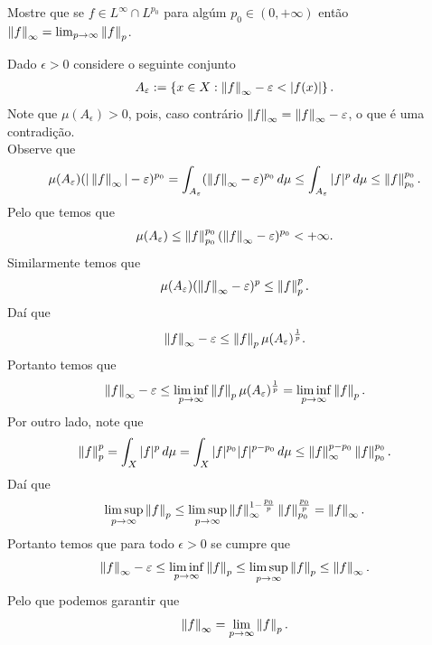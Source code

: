 \begin{homeworkProblem}[5]
  Mostre que se $f\in L^{\infty}\cap L^{p_0}$ para algúm $p_0\in (0,+\infty)$ então $\left\|f\right\|_{\infty}=\lim_{p \to \infty}\left\|f\right\|_p$. 
  \begin{solution}
    Dado $\epsilon>0$ considere o seguinte conjunto
    \begin{align*}
      A_{\epsilon}:=\left\{ x\in X: \norm{f}_{\infty}-\epsilon<|f(x)| \right\}.
    \end{align*}
    Note que $\mu(A_\epsilon)>0$, pois, caso contrário $\left\|f\right\|_{\infty}=\left\|f\right\|_{\infty}-\varepsilon$, o que é uma contradição.\\
    Observe que
    \begin{align*}
      \mu(A_{\varepsilon})(|\left\|f\right\|_{\infty}|-\varepsilon)^{p_0}=\int_{A_{\varepsilon}}(\left\|f\right\|_{\infty}-\varepsilon)^{p_0}\,d\mu\leq \int_{A_\varepsilon}|f|^{p}\,d\mu\leq \left\|f\right\|_{p_0}^{p_0}.
    \end{align*}
    Pelo que temos que
    \begin{align*}
      \mu(A_\varepsilon)\leq \left\|f\right\|_{p_0}^{p_0}(\left\|f\right\|_{\infty}-\varepsilon)^{p_0}<+\infty.
    \end{align*}
    Similarmente temos que
    \begin{align*}
      \mu(A_\varepsilon)(\left\|f\right\|_{\infty}-\varepsilon)^{p}\leq \left\|f\right\|_{p}^{p}.
    \end{align*}
    Daí que
    \begin{align*}
      \left\|f\right\|_{\infty}-\varepsilon\leq\left\|f\right\|_{p}\mu(A_\varepsilon)^{\frac{1}{p}}.
    \end{align*}
    Portanto temos que
    \begin{align*}
      \left\|f\right\|_{\infty}-\varepsilon\leq \liminf_{p \to \infty}\left\|f\right\|_{p}\mu(A_{\varepsilon})^{\frac{1}{p}}=\liminf_{p\to\infty}\left\|f\right\|_p.
    \end{align*}
    Por outro lado, note que
    \begin{align*}
      \left\|f\right\|_{p}^{p}=\int_{X}|f|^{p}\,d\mu=\int_{X}|f|^{p_0}|f|^{p-p_0}\,d\mu\leq \left\|f\right\|_{\infty}^{p-p_0}\left\|f\right\|_{p_0}^{p_0}.
    \end{align*}
    Daí que
    \begin{align*}
      \limsup_{p \to \infty}\left\|f\right\|_p\leq \limsup_{p \to \infty}\left\|f\right\|_{\infty}^{1-\frac{p_0}{p}}\left\|f\right\|_{p_0}^{\frac{p_0}{p}}=\left\|f\right\|_{\infty}.
    \end{align*}
    Portanto temos que para todo $\epsilon>0$ se cumpre que
    \begin{align*}
      \left\|f\right\|_{\infty}-\varepsilon\leq\liminf_{p\to\infty}\left\|f\right\|_{p}\leq\limsup_{p\to\infty}\left\|f\right\|_{p}\leq\left\|f\right\|_{\infty}.
    \end{align*}
    Pelo que podemos garantir que
    \begin{align*}
      \left\|f\right\|_{\infty}=\lim_{p \to \infty}\left\|f\right\|_{p}.
    \end{align*}
  \end{solution}
\end{homeworkProblem}
